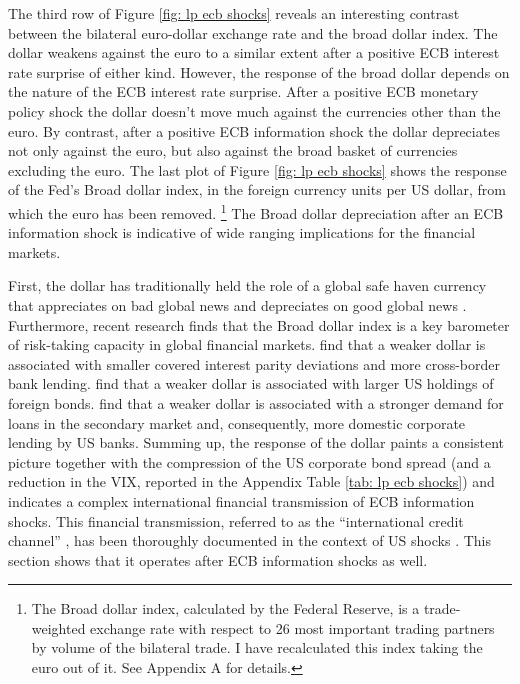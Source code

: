 \documentclass[a4paper,12pt]{article}
\begin{document}
The third row of Figure \ref{fig: lp ecb shocks} reveals an interesting contrast between
the bilateral euro-dollar exchange rate and the broad dollar index. 
The dollar weakens against the euro to a similar extent after
a positive ECB interest rate surprise of either kind.
However, the response of the broad dollar depends on the nature of the ECB interest rate surprise. After a positive ECB monetary policy shock the dollar doesn't move much against the currencies other than the euro.
By contrast, after a positive ECB information shock the dollar depreciates not only against
the euro, but also against
the broad basket of currencies excluding the euro.
The last plot of Figure \ref{fig: lp ecb shocks} shows the response of the Fed's Broad dollar index,
in the foreign currency units per US dollar, from which the euro has been removed.%
\footnote{The Broad dollar index, calculated
by the Federal Reserve, is a trade-weighted exchange rate with respect to 26 most important trading partners
by volume of the bilateral trade. I have recalculated this index taking the euro out of it. See Appendix A for details.\label{foot: broad dollar}}
The Broad dollar depreciation after an ECB information shock is indicative of wide ranging implications for the financial markets.

First, the dollar has traditionally held the role
of a global safe haven currency that appreciates on bad global news and depreciates on good global news \citep[e.g.][]{Gourinchas_etal_2010,Habib_Stracca_2015}. 
Furthermore, recent research finds that the Broad dollar index is a key barometer of risk-taking capacity in global financial markets.
\cite{Avdjiev_Du_Koch_Shin_2019} find that a weaker dollar is associated with smaller covered interest parity deviations and more cross-border bank lending.
\cite{Lilley_Maggiori_Neiman_Schreger_2019} find that a weaker dollar is associated with larger US holdings of foreign bonds.
\cite{Niepmann_Schmidt_2019} find that a weaker dollar is associated with a stronger demand for loans in the secondary market and, consequently, more domestic corporate lending by US banks.
Summing up, the response of the dollar paints a consistent picture together with the compression of the US corporate bond spread (and a reduction in the VIX, reported in the Appendix Table \ref{tab: lp ecb shocks}) and indicates a complex international financial transmission of ECB information shocks.
This financial transmission, referred to as the ``international credit channel'' \citep{Rey_2016},
has been thoroughly documented in the context of US shocks \citep{CesaBianchi_Sokol_2022}.
This section shows that it operates after ECB information shocks as well.
\end{document}
